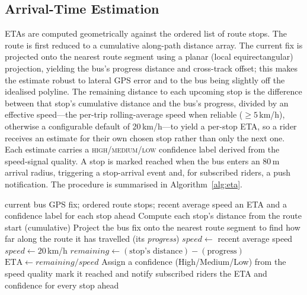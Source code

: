 \documentclass[conference]{IEEEtran}
\begin{document}
\subsection{Arrival-Time Estimation}
\label{sec:impl-eta}
ETAs are computed geometrically against the ordered list of route stops. The
route is first reduced to a cumulative along-path distance array. The current
fix is projected onto the nearest route segment using a planar (local
equirectangular) projection, yielding the bus's progress distance and
cross-track offset; this makes the estimate robust to lateral GPS error and
to the bus being slightly off the idealised polyline. The remaining distance
to each upcoming stop is the difference between that stop's cumulative
distance and the bus's progress, divided by an effective speed---the per-trip
rolling-average speed when reliable ($\geq 5$\,km/h), otherwise a configurable
default of 20\,km/h---to yield a per-stop ETA, so a rider receives an estimate
for their own chosen stop rather than only the next one. Each estimate carries
a \textsc{high}/\textsc{medium}/\textsc{low} confidence label derived from the
speed-signal quality. A stop is marked reached when the bus enters an 80\,m
arrival radius, triggering a stop-arrival event and, for subscribed riders, a
push notification. The procedure is summarised in Algorithm~\ref{alg:eta}.

\begin{algorithm}[!t]
\fontsize{9.0}{11.0}\selectfont
\caption{Estimating the ETA to every upcoming stop}
\label{alg:eta}
\begin{algorithmic}[1]
\Require current bus GPS fix; ordered route stops; recent average speed
\Ensure an ETA and a confidence label for each stop ahead
\State Compute each stop's distance from the route start (cumulative)
\State Project the bus fix onto the nearest route segment to find how far
  along the route it has travelled (its \emph{progress})
  \State $speed \gets$ recent average speed
\Else
  \State $speed \gets 20$\,km/h 
\EndIf
{}
  \State $remaining \gets (\text{stop's distance}) - (\text{progress})$
  \State $\text{ETA} \gets remaining / speed$
\EndFor
\State Assign a confidence (High/Medium/Low) from the speed quality
  \State mark it reached and notify subscribed riders
\EndIf
\State \Return the ETA and confidence for every stop ahead
\end{algorithmic}
\end{algorithm}
\end{document}
